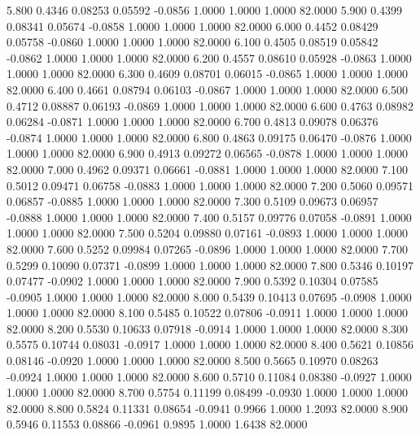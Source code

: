    5.800   0.4346   0.08253   0.05592  -0.0856   1.0000   1.0000   1.0000  82.0000
   5.900   0.4399   0.08341   0.05674  -0.0858   1.0000   1.0000   1.0000  82.0000
   6.000   0.4452   0.08429   0.05758  -0.0860   1.0000   1.0000   1.0000  82.0000
   6.100   0.4505   0.08519   0.05842  -0.0862   1.0000   1.0000   1.0000  82.0000
   6.200   0.4557   0.08610   0.05928  -0.0863   1.0000   1.0000   1.0000  82.0000
   6.300   0.4609   0.08701   0.06015  -0.0865   1.0000   1.0000   1.0000  82.0000
   6.400   0.4661   0.08794   0.06103  -0.0867   1.0000   1.0000   1.0000  82.0000
   6.500   0.4712   0.08887   0.06193  -0.0869   1.0000   1.0000   1.0000  82.0000
   6.600   0.4763   0.08982   0.06284  -0.0871   1.0000   1.0000   1.0000  82.0000
   6.700   0.4813   0.09078   0.06376  -0.0874   1.0000   1.0000   1.0000  82.0000
   6.800   0.4863   0.09175   0.06470  -0.0876   1.0000   1.0000   1.0000  82.0000
   6.900   0.4913   0.09272   0.06565  -0.0878   1.0000   1.0000   1.0000  82.0000
   7.000   0.4962   0.09371   0.06661  -0.0881   1.0000   1.0000   1.0000  82.0000
   7.100   0.5012   0.09471   0.06758  -0.0883   1.0000   1.0000   1.0000  82.0000
   7.200   0.5060   0.09571   0.06857  -0.0885   1.0000   1.0000   1.0000  82.0000
   7.300   0.5109   0.09673   0.06957  -0.0888   1.0000   1.0000   1.0000  82.0000
   7.400   0.5157   0.09776   0.07058  -0.0891   1.0000   1.0000   1.0000  82.0000
   7.500   0.5204   0.09880   0.07161  -0.0893   1.0000   1.0000   1.0000  82.0000
   7.600   0.5252   0.09984   0.07265  -0.0896   1.0000   1.0000   1.0000  82.0000
   7.700   0.5299   0.10090   0.07371  -0.0899   1.0000   1.0000   1.0000  82.0000
   7.800   0.5346   0.10197   0.07477  -0.0902   1.0000   1.0000   1.0000  82.0000
   7.900   0.5392   0.10304   0.07585  -0.0905   1.0000   1.0000   1.0000  82.0000
   8.000   0.5439   0.10413   0.07695  -0.0908   1.0000   1.0000   1.0000  82.0000
   8.100   0.5485   0.10522   0.07806  -0.0911   1.0000   1.0000   1.0000  82.0000
   8.200   0.5530   0.10633   0.07918  -0.0914   1.0000   1.0000   1.0000  82.0000
   8.300   0.5575   0.10744   0.08031  -0.0917   1.0000   1.0000   1.0000  82.0000
   8.400   0.5621   0.10856   0.08146  -0.0920   1.0000   1.0000   1.0000  82.0000
   8.500   0.5665   0.10970   0.08263  -0.0924   1.0000   1.0000   1.0000  82.0000
   8.600   0.5710   0.11084   0.08380  -0.0927   1.0000   1.0000   1.0000  82.0000
   8.700   0.5754   0.11199   0.08499  -0.0930   1.0000   1.0000   1.0000  82.0000
   8.800   0.5824   0.11331   0.08654  -0.0941   0.9966   1.0000   1.2093  82.0000
   8.900   0.5946   0.11553   0.08866  -0.0961   0.9895   1.0000   1.6438  82.0000
